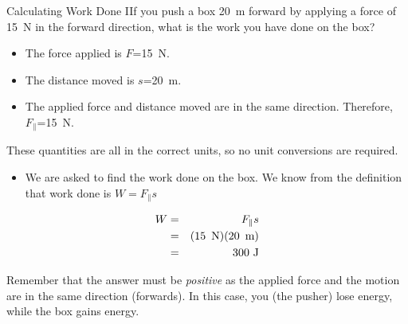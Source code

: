 \begin{wex}{Calculating Work Done I}{If you push a box 20~m forward by applying a force of 15~N in the forward direction, what is the work you have done on the box?}
{
\begin{itemize}
\item The force applied is $F$=15~N.
\item The distance moved is $s$=20~m.
\item The applied force and distance moved are in the same
direction. Therefore, $F_{\|}$=15~N.
\end{itemize}
These quantities are all in the correct units, so no unit conversions
are required.

\begin{itemize}
\item We are asked to find the work done on the box. We know from the
definition that work done is $W=F_{\|}s$
\end{itemize}


\begin{eqnarray*}
W&=&F_{\|} s\\
&=& (15\ \,\rm{N})(20\ \,\rm{m})\\
&=& 300\ \rm{J}
\end{eqnarray*}

Remember that the answer must be {\em positive} as the applied force and the motion are in the same direction (forwards). In this case, you (the pusher) lose energy, while the box gains energy.}
\end{wex}

